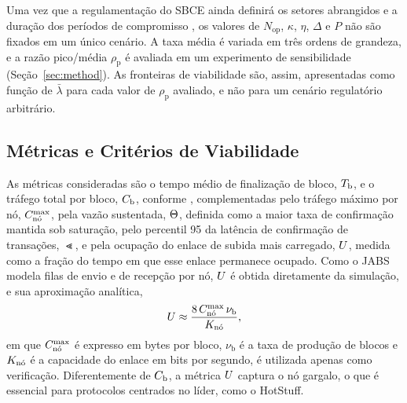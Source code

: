 Uma vez que a regulamentação do SBCE ainda definirá os setores abrangidos e a duração dos períodos de compromisso \citep{Lei15042}, os valores de $N_{\mathrm{op}}$, $\kappa$, $\eta$, $\Delta$ e $P$ não são fixados em um único cenário. A taxa média é variada em três ordens de grandeza, e a razão pico/média $\rho_{\mathrm{p}}$ é avaliada em um experimento de sensibilidade (Seção~\ref{sec:method}). As fronteiras de viabilidade são, assim, apresentadas como função de $\bar{\lambda}$ para cada valor de $\rho_{\mathrm{p}}$ avaliado, e não para um cenário regulatório arbitrário. 

\subsection{Métricas e Critérios de Viabilidade}

As métricas consideradas são o tempo médio de finalização de bloco, $\Tb$, e o tráfego total por bloco, $\Cb$, conforme \citep{Caburlao2025reic,Caburlao2026clei}, complementadas pelo tráfego máximo por nó, $\Cn$, pela vazão sustentada, $\Th$, definida como a maior taxa de confirmação mantida sob saturação, pelo percentil 95 da latência de confirmação de transações, $\Lt$, e pela ocupação do enlace de subida mais carregado, $\Ut$, medida como a fração do tempo em que esse enlace permanece ocupado. Como o JABS modela filas de envio e de recepção por nó, $\Ut$ é obtida diretamente da simulação, e sua aproximação analítica,
\begin{equation}
\Ut \approx \frac{8\, \Cn\, \nu_{\mathrm{b}}}{\Kn},
\label{eq:util}
\end{equation}
em que $\Cn$ é expresso em bytes por bloco, $\nu_{\mathrm{b}}$ é a taxa de produção de blocos e $\Kn$ é a capacidade do enlace em bits por segundo, é utilizada apenas como verificação. Diferentemente de $\Cb$, a métrica $\Ut$ captura o nó gargalo, o que é essencial para protocolos centrados no líder, como o HotStuff.

